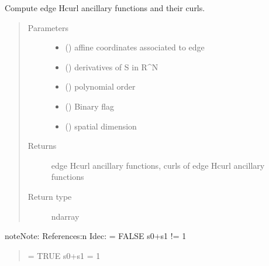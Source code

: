 \documentclass[letterpaper,10pt,english]{sphinxmanual}
\begin{document}
\begin{fulllineitems}
\label{\detokenize{petgem/hvfem:petgem.hvfem.AncEE}}
Compute edge Hcurl ancillary functions and their curls.
\begin{quote}\begin{description}
\item[{Parameters}] \leavevmode\begin{itemize}
\item {} 
 () \textendash{} affine coordinates associated to edge

\item {} 
 () \textendash{} derivatives of S in R\textasciicircum{}N

\item {} 
 () \textendash{} polynomial order

\item {} 
 () \textendash{} Binary flag

\item {} 
 () \textendash{} spatial dimension

\end{itemize}

\item[{Returns}] \leavevmode
edge Hcurl ancillary functions, curls of edge Hcurl ancillary functions

\item[{Return type}] \leavevmode
ndarray

\end{description}\end{quote}

\begin{sphinxadmonition}{note}{Note:}
References:n
Idec: = FALSE  s0+s1 != 1
\begin{quote}

= TRUE   s0+s1  = 1
\end{quote}
\end{sphinxadmonition}

\end{fulllineitems}
\end{document}
